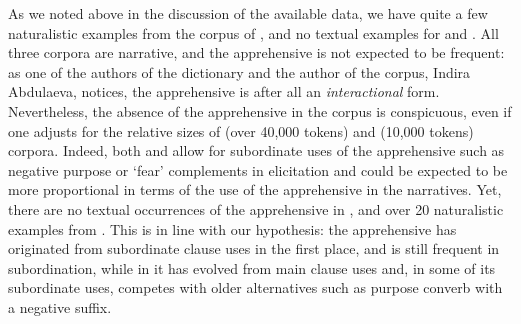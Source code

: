 \documentclass[output=paper,colorlinks,citecolor=brown]{langscibook}
\begin{document}
As we noted above in the discussion of the available data, we have quite a few naturalistic examples from the corpus of , and no textual examples for  and . All three corpora are narrative, and the apprehensive is not expected to be frequent: as one of the authors of the  dictionary and the author of the  corpus, Indira Abdulaeva, notices, the  apprehensive is after all an \textit{interactional} form. Nevertheless, the absence of the apprehensive in the  corpus is conspicuous, even if one adjusts for the relative sizes of  (over 40,000 tokens) and  (10,000 tokens) corpora. Indeed, both  and  allow for subordinate uses of the apprehensive such as negative purpose or `fear' complements in elicitation and could be expected to be more proportional in terms of the use of the apprehensive in the narratives. Yet, there are no textual occurrences of the apprehensive in , and over 20 naturalistic examples from . This is in line with our hypothesis: the  apprehensive has originated from subordinate clause uses in the first place, and is still frequent in subordination, while in  it has evolved from main clause uses and, in some of its subordinate uses, competes with older alternatives such as purpose converb with a negative suffix.
\end{document}
